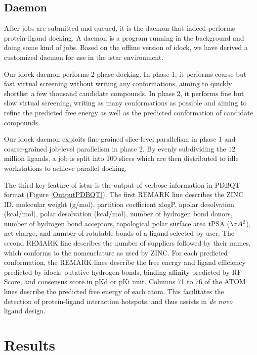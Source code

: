 \documentclass[10pt]{article}
\begin{document}
\subsection*{Daemon}
After jobs are submitted and queued, it is the daemon that indeed performs protein-ligand docking. A daemon is a program running in the background and doing some kind of jobs. Based on the offline version of idock, we have derived a customized daemon for use in the istar environment.

Our idock daemon performs 2-phase docking. In phase 1, it performs coarse but fast virtual screening without writing any conformations, aiming to quickly shortlist a few thousand candidate compounds. In phase 2, it performs fine but slow virtual screening, writing as many conformations as possible and aiming to refine the predicted free energy as well as the predicted conformation of candidate compounds.

Our idock daemon exploits fine-grained slice-level parallelism in phase 1 and coarse-grained job-level parallelism in phase 2. By evenly subdividing the 12 million ligands, a job is split into 100 slices which are then distributed to idle workstations to achieve parallel docking.

The third key feature of istar is the output of verbose information in PDBQT format (Figure \ref{OutputPDBQT}). The first REMARK line describes the ZINC ID, molecular weight (g/mol), partition coefficient xlogP, apolar desolvation (kcal/mol), polar desolvation (kcal/mol), number of hydrogen bond donors, number of hydrogen bond acceptors, topological polar surface area tPSA ($\AA^2$), net charge, and number of rotatable bonds of a ligand selected by user. The second REMARK line describes the number of suppliers followed by their names, which conforms to the nomenclature as used by ZINC. For each predicted conformation, the REMARK lines describe the free energy and ligand efficiency predicted by idock, putative hydrogen bonds, binding affinity predicted by RF-Score, and consensus score in pKd or pKi unit. Columns 71 to 76 of the ATOM lines describe the predicted free energy of each atom. This facilitates the detection of protein-ligand interaction hotspots, and thus assists in \textit{de novo} ligand design.

\section*{Results}
\end{document}
